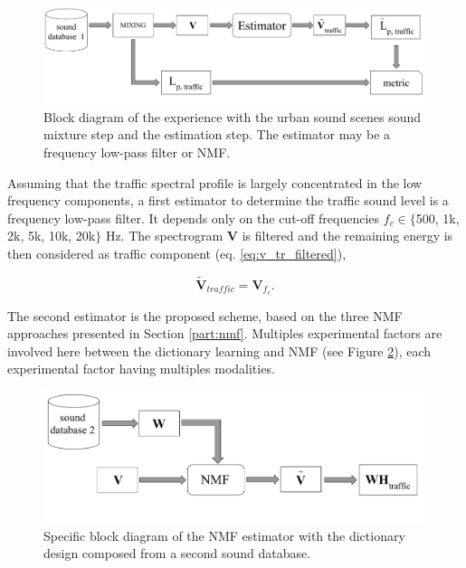 \documentclass[twocolumn]{svjour3}          %
\begin{document}
\begin{figure}
    \centering
    \includegraphics[width=\linewidth]{figures/bloc_diagram_estimator.pdf}
    \caption{Block diagram of the experience with the urban sound scenes sound mixture step and the estimation step. The estimator may be a frequency low-pass filter or NMF.}
    \label{fig:bloc_experiment}
\end{figure}

Assuming that the traffic spectral profile is largely concentrated in the low frequency components, a first estimator to determine the traffic sound level is a frequency low-pass filter. It depends only on the cut-off frequencies $f_c \in  \lbrace$500, 1k, 2k, 5k, 10k, 20k$\rbrace$ Hz. The spectrogram $\mathbf{V}$ is filtered and the remaining energy is then considered as traffic component (eq. \ref{eq:v_tr_filtered}),

\begin{equation}\label{eq:v_tr_filtered}
\mathbf{\tilde{V}}_{traffic} = \mathbf{V}_{f_c}.
\end{equation}

The second estimator is the proposed scheme, based on the three NMF approaches presented in Section \ref{part:nmf}. Multiples experimental factors are involved here between the dictionary learning and NMF (see Figure \ref{fig:bloc_nmf}), each experimental factor having multiples modalities.

\begin{figure}
    \centering
    \includegraphics[width=\linewidth]{figures/bloc_diagram_NMF_EN_2.pdf}
    \caption{Specific block diagram of the NMF estimator with the dictionary design composed from a second sound database.}
    \label{fig:bloc_nmf}
\end{figure}
\end{document}
